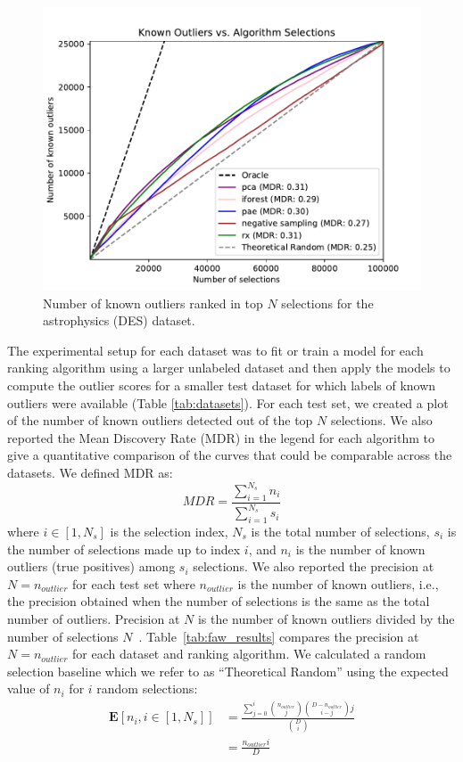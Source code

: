 \documentclass[letterpaper]{article} %
\begin{document}
\begin{figure}[h]
    \centering
    \includegraphics[width=\linewidth]{figures/des_combined_plot.pdf}
    \caption{Number of known outliers ranked in top $N$ selections for 
    the astrophysics (DES) dataset.}
    \label{fig:des_results}
\end{figure}

The experimental setup for each dataset was to fit or train a model for
each ranking algorithm using a larger unlabeled dataset and then apply 
the models to compute the outlier scores for a smaller test dataset for which
labels of known outliers were available (Table \ref{tab:datasets}). 
For each test set, we created a plot of the number of known outliers 
detected out of the top $N$ selections. We also 
reported the Mean Discovery Rate (MDR) in the legend
for each algorithm to give a quantitative comparison of the curves that could
be comparable across the datasets. We defined MDR as:
\begin{equation}
MDR = \frac{\sum^{N_s}_{i=1} n_i}{\sum^{N_s}_{i=1} s_i}
\end{equation}
where $i \in [1, N_s]$ is the selection index,
 $N_s$ is the total number of selections,
 $s_i$ is the number of selections made up to index $i$,
 and $n_i$ is the number of known outliers (true positives)
among $s_i$ selections.
We also reported the precision at $N=n_{outlier}$ for each test set where
$n_{outlier}$ is the number of known outliers, i.e.,  the precision obtained 
when the number of selections is the same as the total number of outliers. 
Precision at $N$ is the number of known outliers divided by the number of 
selections $N$~\citep{campos2016evaluation}.
Table~\ref{tab:faw_results} compares the precision at $N=n_{outlier}$ for
each dataset and ranking algorithm. 
We calculated a random selection baseline which we refer to as ``Theoretical
Random'' using the expected value of $n_i$ for $i$ random selections:
\begin{align}
\mathbf{E}[n_i, i \in[1, N_s]] &= \frac{\sum^i_{j=0} {n_{outlier}\choose j} {D-n_{outlier}\choose i-j} j}{{D\choose i}} \\
&= \frac{n_{outlier}i}{D}
\end{align}
\end{document}
